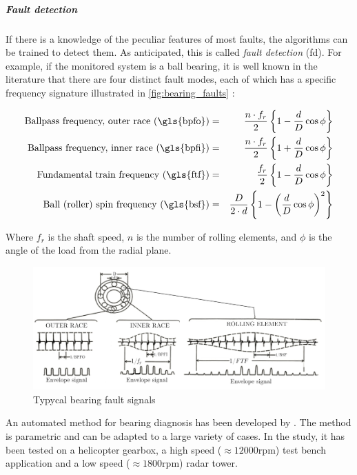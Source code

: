 \subparagraph*{Fault detection}
If there is a knowledge of the peculiar features of most faults, the algorithms can be trained to detect them. As anticipated, this is called \emph{fault detection} (\gls{fd}). For example, if the monitored system is a ball bearing, it is well known in the literature that there are four distinct fault modes, each of which has a specific frequency signature illustrated in \autoref{fig:bearing_faults} \cite{RollingSignature}:

\begin{eqnarray*}
    \text{Ballpass frequency, outer race (\gls{bpfo})}&=& \frac{n\cdot f_r}{2}\left\{1-\frac{d}{D} \cos \phi \right\}\\
    \text{Ballpass frequency, inner race (\gls{bpfi})}&=& \frac{n\cdot f_r}{2}\left\{1+\frac{d}{D} \cos \phi \right\}\\
    \text{Fundamental train frequency (\gls{ftf})}&=& \frac{f_r}{2}\left\{1-\frac{d}{D} \cos \phi \right\}\\
    \text{Ball (roller) spin frequency (\gls{bsf})}&=& \frac{D}{2\cdot d}\left\{1-\left(\frac{d}{D} \cos \phi \right)^2\right\}
\end{eqnarray*}

Where $f_r$ is the shaft speed, $n$ is the number of rolling elements, and $\phi$ is the angle of the load from the radial plane. 

\begin{figure}
    \centering
    \includegraphics[width=\textwidth]{images/StateArt/bearing.jpg}
    \caption{Typycal bearing fault signals \cite{RollingSignature}}
    \label{fig:bearing_faults}
\end{figure}

An automated method for bearing diagnosis has been developed by \cite{sawalhi2008semi}. The method is parametric and can be adapted to a large variety of cases. In the study, it has been tested on a helicopter gearbox, a high speed ($\approx 12000$rpm) test bench application and a low speed ($\approx 1800$rpm) radar tower. 

